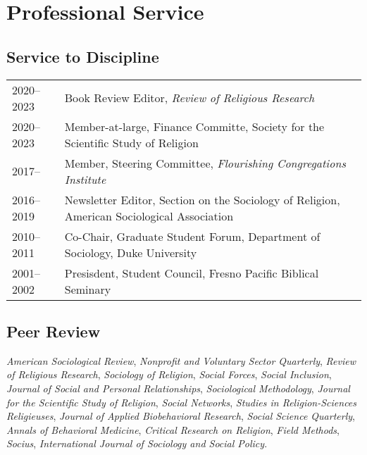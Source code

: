 \section*{Professional Service}
\newcommand{\tabitem}{~~\llap{\textbullet}~~}
\subsection*{Service to Discipline}

\begin{tabular}{p{} p{}}
2020--2023 & Book Review Editor, \textit{Review of Religious Research}\\
2020--2023 & Member-at-large, Finance Committe, Society for the Scientific Study of Religion\\
2017-- & Member, Steering Committee, \textit{Flourishing Congregations Institute}\\
2016--2019 & Newsletter Editor, Section on the Sociology of Religion, American Sociological Association\\
2010--2011 & Co-Chair, Graduate Student Forum, Department of Sociology, Duke University\\
2001--2002 & Presisdent, Student Council, Fresno Pacific Biblical Seminary\\
\end{tabular}

\subsection*{Peer Review}

 \emph{American Sociological Review},
 \emph{Nonproﬁt and Voluntary Sector Quarterly},
 \emph{Review of Religious Research},
 \emph{Sociology of Religion},
 \emph{Social Forces},
 \emph{Social Inclusion},
 \emph{Journal of Social and Personal Relationships},
 \emph{Sociological Methodology},
 \emph{Journal for the Scientiﬁc Study of Religion},
 \emph{Social Networks},
 \emph{Studies in Religion-Sciences Religieuses},
 \emph{Journal of Applied Biobehavioral Research},
 \emph{Social Science Quarterly},
 \emph{Annals of Behavioral Medicine},
 \emph{Critical Research on Religion},
 \emph{Field Methods},
 \emph{Socius},
 \emph{International Journal of Sociology and Social Policy}.
